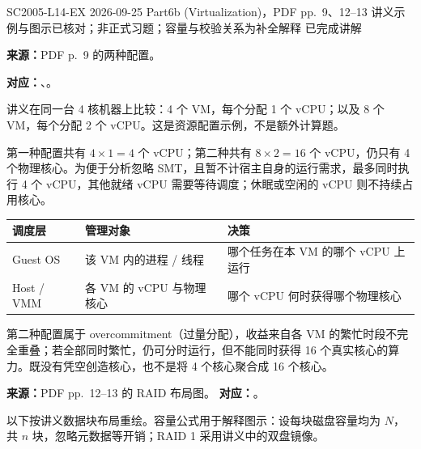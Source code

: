 

\examplemeta
  {SC2005-L14-EX}
  {2026-09-25}
  {Part6b (Virtualization)，PDF pp.~9、12--13}
  {讲义示例与图示已核对；非正式习题；容量与校验关系为补全解释}
  {已完成讲解}


\textbf{来源：}PDF p.~9 的两种配置。

\textbf{对应：}、。

讲义在同一台 4 核机器上比较：4 个 VM，每个分配 1 个 vCPU；以及 8 个 VM，每个分配 2 个 vCPU。这是资源配置示例，不是额外计算题。

\begin{checkedsolution}
第一种配置共有 $4\times1=4$ 个 vCPU；第二种共有 $8\times2=16$ 个 vCPU，仍只有 4 个物理核心。为便于分析忽略 SMT，且暂不计宿主自身的运行需求，最多同时执行 4 个 vCPU，其他就绪 vCPU 需要等待调度；休眠或空闲的 vCPU 则不持续占用核心。

\begin{center}
\begin{tabularx}{\textwidth}{@{}lXX@{}}
\toprule
调度层 & 管理对象 & 决策 \\
\midrule
Guest OS & 该 VM 内的进程 / 线程 & 哪个任务在本 VM 的哪个 vCPU 上运行 \\
Host / VMM & 各 VM 的 vCPU 与物理核心 & 哪个 vCPU 何时获得哪个物理核心 \\
\bottomrule
\end{tabularx}
\end{center}
第二种配置属于 overcommitment（过量分配），收益来自各 VM 的繁忙时段不完全重叠；若全部同时繁忙，仍可分时运行，但不能同时获得 16 个真实核心的算力。既没有凭空创造核心，也不是将 4 个核心聚合成 16 个核心。
\end{checkedsolution}


\textbf{来源：}PDF pp.~12--13 的 RAID 布局图。\quad
\textbf{对应：}。

以下按讲义数据块布局重绘。容量公式用于解释图示：设每块磁盘容量均为 $N$，共 $n$ 块，忽略元数据等开销；RAID 1 采用讲义中的双盘镜像。

